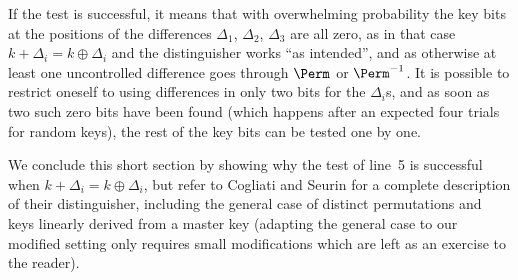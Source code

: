 If the test is successful, it means that with overwhelming probability
the key bits at the positions of the differences $\Delta_1$, $\Delta_2$,
$\Delta_3$ are all zero, as in that case  $k + \Delta_i = k \oplus \Delta_i$ and
the distinguisher works ``as intended'', and as otherwise at least one uncontrolled difference goes through $\Perm$ or $\Perm^{-1}$.
It is possible to restrict oneself to using differences in only two bits for the $\Delta_i$s, and as soon as two such zero bits
have been found (which happens after an expected four trials for
random keys), the rest of the key bits can be tested one by one.

We conclude this short section by showing why the test of line~5 is successful when $k + \Delta_i = k \oplus \Delta_i$,
but refer to Cogliati and Seurin for a complete description of their distinguisher, including the general case of distinct
permutations and keys linearly derived from a master key (adapting the general case to our modified setting only requires small modifications which are left as an exercise to the reader).


